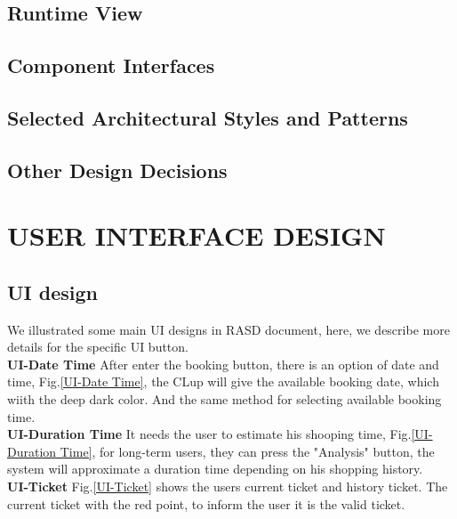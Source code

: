 \documentclass[a4paper,12pt]{report}
\begin{document}
\section{Runtime View}




\section{Component Interfaces}\label{sec:component-interfaces}


\section{Selected Architectural Styles and Patterns}\label{sec:SelectedArchitecturalStylesAndPatterns}


\section{Other Design Decisions}

\chapter{USER INTERFACE DESIGN}\label{ch:user-interface-design}

\section{UI design}
We illustrated some main UI designs in RASD document, here, we describe more details for the specific UI button. ~\\

\textbf{UI-Date Time} After enter the booking button, there is an option of date and time, Fig.\ref{UI-Date Time}, the CLup will give the available booking date, which wiith the deep dark color. And the same method for selecting available booking time.~\\

\textbf{UI-Duration Time} It needs the user to estimate his shooping time, Fig.\ref{UI-Duration Time}, for long-term users, they can press the "Analysis" button, the system will approximate a duration time depending on his shopping history.~\\

\textbf{UI-Ticket}  Fig.\ref{UI-Ticket} shows the users current ticket and history ticket. The current ticket with the red point, to inform the user it is the valid ticket.~\\
\end{document}
